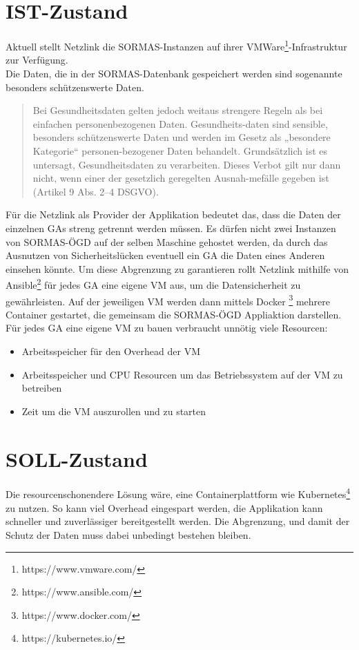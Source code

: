 \section{IST-Zustand}
Aktuell stellt Netzlink die \ac{SORMAS}-Instanzen auf ihrer VMWare\footnote{https://www.vmware.com/}-Infrastruktur zur Verfügung. 
\\
Die Daten, die in der \ac{SORMAS}-Datenbank gespeichert werden sind sogenannte besonders schützenswerte Daten.
\begin{quote}
    Bei Gesundheitsdaten gelten jedoch weitaus strengere Regeln als bei einfachen personenbezogenen Daten. Gesundheits-daten sind sensible, besonders schützenswerte Daten und werden im Gesetz als „besondere Kategorie“ personen-bezogener Daten behandelt. Grundsätzlich ist es untersagt, Gesundheitsdaten zu verarbeiten. Dieses Verbot gilt nur dann nicht, wenn einer der gesetzlich geregelten Ausnah-mefälle gegeben ist (Artikel 9 Abs. 2–4 DSGVO). 
    \cite{Gesundheitsdatenschutz}
\end{quote}
Für die Netzlink als Provider der Applikation bedeutet das, dass die Daten der einzelnen \ac{GAs} streng getrennt werden müssen. 
Es dürfen nicht zwei Instanzen von \ac{SORMAS-ÖGD} auf der selben Maschine gehostet werden, da durch das Ausnutzen von Sicherheitslücken eventuell ein \ac{GA} die Daten eines Anderen einsehen könnte.
Um diese Abgrenzung zu garantieren rollt Netzlink mithilfe von Ansible\footnote{https://www.ansible.com/} für jedes \ac{GA} eine eigene \ac{VM} aus, um die Datensicherheit zu gewährleisten.
Auf der jeweiligen \ac{VM} werden dann mittels Docker \footnote{https://www.docker.com/} mehrere Container gestartet, die gemeinsam die \ac{SORMAS-ÖGD} Appliaktion darstellen.
\\
Für jedes \ac{GA} eine eigene VM zu bauen verbraucht unnötig viele Resourcen:
\begin{itemize}
    \item Arbeitsspeicher für den Overhead der \ac{VM}
    \item Arbeitsspeicher und CPU Resourcen um das Betriebssystem auf der \ac{VM} zu betreiben
    \item Zeit um die \ac{VM} auszurollen und zu starten 
\end{itemize}

\section{SOLL-Zustand}
Die resourcenschonendere Lösung wäre, eine Containerplattform wie Kubernetes\footnote{https://kubernetes.io/} zu nutzen.
So kann viel Overhead eingespart werden, die Applikation kann schneller und zuverlässiger bereitgestellt werden. 
Die Abgrenzung, und damit der Schutz der Daten muss dabei unbedingt bestehen bleiben.

